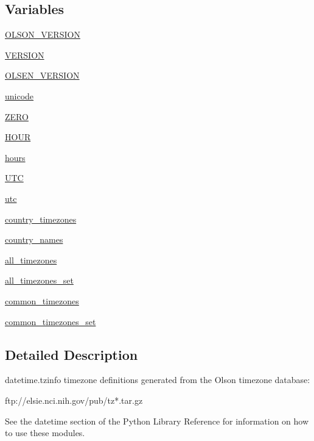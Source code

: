 \subsection*{Variables}
\begin{DoxyCompactItemize}
\item 
\hyperlink{namespacepytz_acfac5ce43a9cbf4370e913fdd09823fd}{O\+L\+S\+O\+N\+\_\+\+V\+E\+R\+S\+I\+ON}
\item 
\hyperlink{namespacepytz_abeb8992f4c2062ee7a06057a81fb32b8}{V\+E\+R\+S\+I\+ON}
\item 
\hyperlink{namespacepytz_ad20ee0e4fe22cfeab729b8fceedbe3c0}{O\+L\+S\+E\+N\+\_\+\+V\+E\+R\+S\+I\+ON}
\item 
\hyperlink{namespacepytz_a009a80d7121e28d768e98ff4c17e8143}{unicode}
\item 
\hyperlink{namespacepytz_a1ab5e8af2b17453c978d10ee2434766c}{Z\+E\+RO}
\item 
\hyperlink{namespacepytz_abc0dcd675cea2f2c99078059f1ff3f8b}{H\+O\+UR}
\item 
\hyperlink{namespacepytz_af8649e079377bfcda685487b70ffee4a}{hours}
\item 
\hyperlink{namespacepytz_a31f8b6b17d0fae5e40c63b26c0779755}{U\+TC}
\item 
\hyperlink{namespacepytz_a5504f2a21bc800e653c57de6aa2f4eff}{utc}
\item 
\hyperlink{namespacepytz_abfb013c5058754a68284b93ad20f3633}{country\+\_\+timezones}
\item 
\hyperlink{namespacepytz_aa4d8e6ba5de8d55fe984af30d09f1b4e}{country\+\_\+names}
\item 
\hyperlink{namespacepytz_a6b2d3edbe035a1b6410f3302cd83d3a7}{all\+\_\+timezones}
\item 
\hyperlink{namespacepytz_adda1f9fb3669a885d1976a5138adcdfc}{all\+\_\+timezones\+\_\+set}
\item 
\hyperlink{namespacepytz_a13415689e339f0e57015fde74581ab87}{common\+\_\+timezones}
\item 
\hyperlink{namespacepytz_acd5ed7bd5342964bad02f40bbe73ef1a}{common\+\_\+timezones\+\_\+set}
\end{DoxyCompactItemize}


\subsection{Detailed Description}
\begin{DoxyVerb}datetime.tzinfo timezone definitions generated from the
Olson timezone database:

    ftp://elsie.nci.nih.gov/pub/tz*.tar.gz

See the datetime section of the Python Library Reference for information
on how to use these modules.
\end{DoxyVerb}
 

